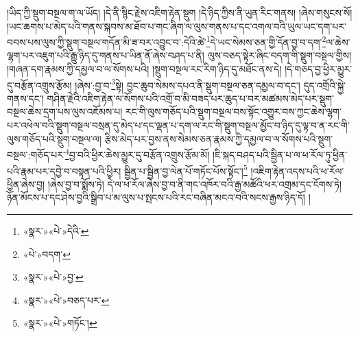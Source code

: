 །ཡིད་ཀྱི་སྡུག་བསྔལ་ག་ལ་ཡོད། །དེ་ནི་སྙིང་རྗེས་འཇིག་རྟེན་སྡུག །དེ་ཉིད་ཀྱིས་ནི་ཡུན་རིང་གནས། །ཞེས་གསུངས་སོ། །ཡང་ཆགས་པ་མེད་པའི་གནས་སྐབས་མ་ཐོབ་པ་གང་ཞིག་ལ་ལུས་གནས་པ་དང་འགལ་བའི་ཡུལ་ཡང་དག་པར་བབས་པས་ལུས་ཀྱི་སྡུག་བསྔལ་གདོན་མི་ཟ་བར་འབྱུང་བ་:དེའི་ཚེ་\footnote{«སྣར་»«པེ་»དེའི་}དེ་ཡང་སེམས་ཅན་གྱི་དོན་བྱ་བ་དག་\footnote{«པེ་»བདག་}ལ་ཆེས་ལྷག་པར་འཇུག་པའི་རྒྱུ་ཉིད་དུ་གནས་པ་ཡིན་ནོ་ཞེས་བཤད་པ་ནི། ལུས་བཅད་སྟེར་ཞིང་བདག་གི་སྡུག་བསྔལ་གྱིས། །གཞན་དག་རྣམས་ཀྱི་དམྱལ་བ་ལ་སོགས་པའི། །སྡུག་བསྔལ་རང་རིག་ཉིད་དུ་མཐོང་ནས་དེ། །དེ་གཅད་བྱ་ཕྱིར་མྱུར་དུ་བརྩོན་འགྲུས་རྩོམ། །ཞེས་:བྱ་བ་\footnote{«སྣར་»«པེ་»བྱ་}སྟེ། བྱང་ཆུབ་སེམས་དཔའ་ནི་སྡུག་བསྔལ་ཅན་དམྱལ་བ་དང་། དུད་འགྲོའི་སྐྱེ་གནས་དང་། གཤིན་རྗེའི་འཇིག་རྟེན་ལ་སོགས་པའི་འགྲོ་བ་མི་བཟད་པར་ཆུད་པ་བར་མཚམས་མེད་པར་སྡུག་བསྔལ་ཆེས་དྲག་པས་ལུས་འཇོམས་པ། རང་གི་ལུས་གཅོད་པའི་སྡུག་བསྔལ་བས་སྟོང་འགྱུར་བས་ཀྱང་ཆེས་ལྷག་པར་འཕེལ་བའི་སྡུག་བསྔལ་བསྲན་དུ་མེད་པ་དང་ལྡན་པ་དག་ལ་རང་གི་སྡུག་བསྔལ་མྱོང་བ་ཉིད་དུ་ལྟ་བ་ན་རང་གི་ལུས་གཅོད་པའི་སྡུག་བསྔལ་ལ། རྩིས་མེད་པར་བྱས་ནས་སེམས་ཅན་རྣམས་ཀྱི་དམྱལ་བ་ལ་སོགས་པའི་སྡུག་བསྔལ་:གཅོད་པར་\footnote{«སྣར་»«པེ་»བཅད་པར་}བྱ་བའི་ཕྱིར་ཆེས་མྱུར་དུ་བརྩོན་འགྲུས་རྩོམ་མོ། །ཇི་སྐད་བཤད་པའི་སྦྱིན་པ་ལ་ཕ་རོལ་ཏུ་ཕྱིན་པའི་རྣམ་པར་དབྱེ་བ་བསྟན་པའི་ཕྱིར། སྦྱིན་པ་སྦྱིན་བྱ་ལེན་པོ་གཏོང་པོས་སྟོང་།\footnote{«སྣར་»«པེ་»གཏོང་།} །འཇིག་རྟེན་འདས་པའི་ཕ་རོལ་ཕྱིན་ཞེས་བྱ། །ཞེས་བྱ་བ་སྨོས་ཏེ། དེ་ལ་ཕ་རོལ་ཞེས་བྱ་བ་ནི་གང་འཁོར་བའི་རྒྱ་མཚོའི་ཕར་འགྲམ་དང་ངོགས་ཏེ། ཉོན་མོངས་པ་དང་ཤེས་བྱའི་སྒྲིབ་པ་མ་ལུས་པ་སྤངས་པའི་རང་བཞིན་མངའ་བའི་སངས་རྒྱས་ཉིད་དོ། །
